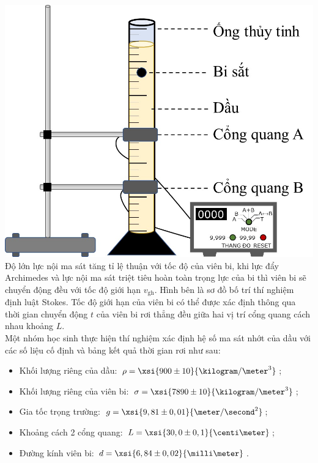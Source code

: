 \begin{ex}
	{\vspace{-0.75cm}\includegraphics[scale=0.5]{../figs/D10-KTTX3-001-8}}
	Độ lớn lực nội ma sát tăng tỉ lệ thuận với tốc độ của viên bi, khi lực đẩy Archimedes và lực nội ma sát triệt tiêu hoàn toàn trọng lực của bi thì viên bi sẽ chuyển động đều với tốc độ giới hạn $v_{\mathrm{gh}}$. Hình bên là sơ đồ bố trí thí nghiệm định luật Stokes. Tốc độ giới hạn của viên bi có thể được xác định thông qua thời gian chuyển động $t$ của viên bi rơi thẳng đều giữa hai vị trí cổng quang cách nhau khoảng $L$.\\
	Một nhóm học sinh thực hiện thí nghiệm xác định hệ số ma sát nhớt của dầu với các số liệu cố định và bảng kết quả thời gian rơi như sau:
	\begin{itemize}
		\item Khối lượng riêng của dầu: $\rho=\xsi{900\pm10}{\kilogram/\meter^3}$;
		\item Khối lượng riêng của viên bi: $\sigma=\xsi{7890\pm 10}{\kilogram/\meter^3}$;
		\item Gia tốc trọng trường: $g=\xsi{9,81\pm 0,01}{\meter/\second^2}$;
		\item Khoảng cách 2 cổng quang: $L=\xsi{30,0\pm 0,1}{\centi\meter}$;
		\item Đường kính viên bi: $d=\xsi{6,84\pm0,02}{\milli\meter}$.
	\end{itemize}
	

\end{ex}
